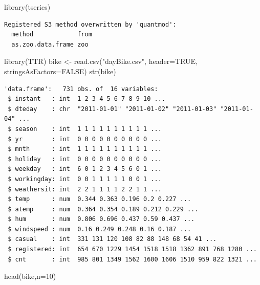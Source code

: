 \documentclass[
  letterpaper,
  DIV=11,
  numbers=noendperiod]{scrreprt}
\newenvironment{Shaded}{\begin{snugshade}}{\end{snugshade}}
\newcommand{\AttributeTok}[1]{\textcolor[rgb]{0.40,0.45,0.13}{#1}}
\newcommand{\ConstantTok}[1]{\textcolor[rgb]{0.56,0.35,0.01}{#1}}
\newcommand{\DecValTok}[1]{\textcolor[rgb]{0.68,0.00,0.00}{#1}}
\newcommand{\FunctionTok}[1]{\textcolor[rgb]{0.28,0.35,0.67}{#1}}
\newcommand{\NormalTok}[1]{\textcolor[rgb]{0.00,0.23,0.31}{#1}}
\newcommand{\OtherTok}[1]{\textcolor[rgb]{0.00,0.23,0.31}{#1}}
\newcommand{\StringTok}[1]{\textcolor[rgb]{0.13,0.47,0.30}{#1}}
\begin{document}
\begin{Shaded}
\begin{Highlighting}[]
\FunctionTok{library}\NormalTok{(tseries)}
\end{Highlighting}
\end{Shaded}

\begin{verbatim}
Registered S3 method overwritten by 'quantmod':
  method            from
  as.zoo.data.frame zoo 
\end{verbatim}

\begin{Shaded}
\begin{Highlighting}[]
\FunctionTok{library}\NormalTok{(TTR)}
\NormalTok{bike }\OtherTok{\textless{}{-}} \FunctionTok{read.csv}\NormalTok{(}\StringTok{"dayBike.csv"}\NormalTok{, }\AttributeTok{header=}\ConstantTok{TRUE}\NormalTok{, }\AttributeTok{stringsAsFactors=}\ConstantTok{FALSE}\NormalTok{)}
\FunctionTok{str}\NormalTok{(bike)}
\end{Highlighting}
\end{Shaded}

\begin{verbatim}
'data.frame':   731 obs. of  16 variables:
 $ instant   : int  1 2 3 4 5 6 7 8 9 10 ...
 $ dteday    : chr  "2011-01-01" "2011-01-02" "2011-01-03" "2011-01-04" ...
 $ season    : int  1 1 1 1 1 1 1 1 1 1 ...
 $ yr        : int  0 0 0 0 0 0 0 0 0 0 ...
 $ mnth      : int  1 1 1 1 1 1 1 1 1 1 ...
 $ holiday   : int  0 0 0 0 0 0 0 0 0 0 ...
 $ weekday   : int  6 0 1 2 3 4 5 6 0 1 ...
 $ workingday: int  0 0 1 1 1 1 1 0 0 1 ...
 $ weathersit: int  2 2 1 1 1 1 2 2 1 1 ...
 $ temp      : num  0.344 0.363 0.196 0.2 0.227 ...
 $ atemp     : num  0.364 0.354 0.189 0.212 0.229 ...
 $ hum       : num  0.806 0.696 0.437 0.59 0.437 ...
 $ windspeed : num  0.16 0.249 0.248 0.16 0.187 ...
 $ casual    : int  331 131 120 108 82 88 148 68 54 41 ...
 $ registered: int  654 670 1229 1454 1518 1518 1362 891 768 1280 ...
 $ cnt       : int  985 801 1349 1562 1600 1606 1510 959 822 1321 ...
\end{verbatim}

\begin{Shaded}
\begin{Highlighting}[]
\FunctionTok{head}\NormalTok{(bike,}\AttributeTok{n=}\DecValTok{10}\NormalTok{)}
\end{Highlighting}
\end{Shaded}
\end{document}
